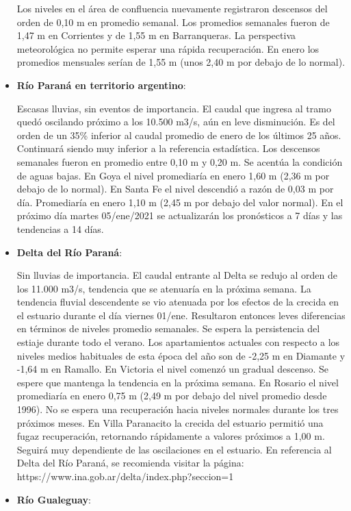 \begin{itemize}
  Los niveles en el área de confluencia nuevamente registraron descensos
  del orden de 0,10 m en promedio semanal. Los promedios semanales
  fueron de 1,47 m en Corrientes y de 1,55 m en Barranqueras. La
  perspectiva meteorológica no permite esperar una rápida recuperación.
  En enero los promedios mensuales serían de 1,55 m (unos 2,40 m por
  debajo de lo normal).
\item
  \textbf{Río Paraná en territorio argentino}:

  Escasas lluvias, sin eventos de importancia. El caudal que ingresa al
  tramo quedó oscilando próximo a los 10.500 m3/s, aún en leve
  disminución. Es del orden de un 35\% inferior al caudal promedio de
  enero de los últimos 25 años. Continuará siendo muy inferior a la
  referencia estadística. Los descensos semanales fueron en promedio
  entre 0,10 m y 0,20 m. Se acentúa la condición de aguas bajas. En Goya
  el nivel promediaría en enero 1,60 m (2,36 m por debajo de lo normal).
  En Santa Fe el nivel descendió a razón de 0,03 m por día. Promediaría
  en enero 1,10 m (2,45 m por debajo del valor normal). En el próximo
  día martes 05/ene/2021 se actualizarán los pronósticos a 7 días y las
  tendencias a 14 días.
\item
  \textbf{Delta del Río Paraná}:

  Sin lluvias de importancia. El caudal entrante al Delta se redujo al
  orden de los 11.000 m3/s, tendencia que se atenuaría en la próxima
  semana. La tendencia fluvial descendente se vio atenuada por los
  efectos de la crecida en el estuario durante el día viernes 01/ene.
  Resultaron entonces leves diferencias en términos de niveles promedio
  semanales. Se espera la persistencia del estiaje durante todo el
  verano. Los apartamientos actuales con respecto a los niveles medios
  habituales de esta época del año son de -2,25 m en Diamante y -1,64 m
  en Ramallo. En Victoria el nivel comenzó un gradual descenso. Se
  espere que mantenga la tendencia en la próxima semana. En Rosario el
  nivel promediaría en enero 0,75 m (2,49 m por debajo del nivel
  promedio desde 1996). No se espera una recuperación hacia niveles
  normales durante los tres próximos meses. En Villa Paranacito la
  crecida del estuario permitió una fugaz recuperación, retornando
  rápidamente a valores próximos a 1,00 m. Seguirá muy dependiente de
  las oscilaciones en el estuario. En referencia al Delta del Río
  Paraná, se recomienda visitar la página:
  https://www.ina.gob.ar/delta/index.php?seccion=1
\item
  \textbf{Río Gualeguay}:


\end{itemize}
